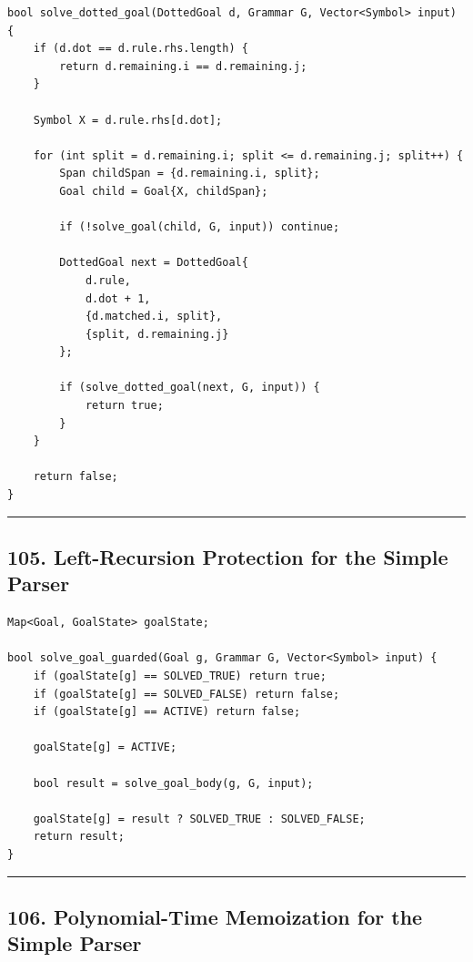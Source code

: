 \documentclass[10pt,letterpaper]{article}
\begin{document}
\begin{verbatim}
bool solve_dotted_goal(DottedGoal d, Grammar G, Vector<Symbol> input) {
    if (d.dot == d.rule.rhs.length) {
        return d.remaining.i == d.remaining.j;
    }

    Symbol X = d.rule.rhs[d.dot];

    for (int split = d.remaining.i; split <= d.remaining.j; split++) {
        Span childSpan = {d.remaining.i, split};
        Goal child = Goal{X, childSpan};

        if (!solve_goal(child, G, input)) continue;

        DottedGoal next = DottedGoal{
            d.rule,
            d.dot + 1,
            {d.matched.i, split},
            {split, d.remaining.j}
        };

        if (solve_dotted_goal(next, G, input)) {
            return true;
        }
    }

    return false;
}
\end{verbatim}

\medskip\hrule\medskip

\subsection*{105. Left-Recursion Protection for the Simple Parser}

\begin{verbatim}
Map<Goal, GoalState> goalState;

bool solve_goal_guarded(Goal g, Grammar G, Vector<Symbol> input) {
    if (goalState[g] == SOLVED_TRUE) return true;
    if (goalState[g] == SOLVED_FALSE) return false;
    if (goalState[g] == ACTIVE) return false;

    goalState[g] = ACTIVE;

    bool result = solve_goal_body(g, G, input);

    goalState[g] = result ? SOLVED_TRUE : SOLVED_FALSE;
    return result;
}
\end{verbatim}

\medskip\hrule\medskip

\subsection*{106. Polynomial-Time Memoization for the Simple Parser}
\end{document}
